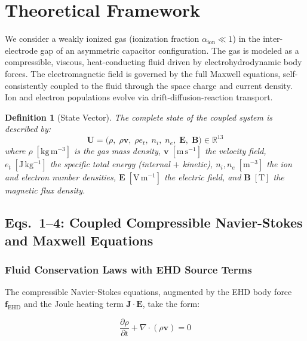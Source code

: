 \documentclass[12pt,twocolumn]{article}
\newtheorem{definition}{Definition}
\newcommand{\ee}{\mathbf{E}}
\newcommand{\bb}{\mathbf{B}}
\newcommand{\jj}{\mathbf{J}}
\newcommand{\vv}{\mathbf{v}}
\newcommand{\ff}{\mathbf{f}}
\newcommand{\uu}{\mathbf{U}}
\begin{document}
\section{Theoretical Framework}
\label{sec:theory}

We consider a weakly ionized gas (ionization fraction
$\alpha_{\mathrm{ion}} \ll 1$) in the inter-electrode gap of an
asymmetric capacitor configuration. The gas is modeled as a
compressible, viscous, heat-conducting fluid driven by
electrohydrodynamic body forces. The electromagnetic field is
governed by the full Maxwell equations, self-consistently coupled to
the fluid through the space charge and current density. Ion and
electron populations evolve via drift-diffusion-reaction transport.

\begin{definition}[State Vector]
\label{def:state}
The complete state of the coupled system is described by:
\begin{equation*}
  \uu = \bigl(\rho,\; \rho\vv,\; \rho e_t,\;
    n_i,\; n_e,\; \ee,\; \bb\bigr)
  \in \mathbb{R}^{13}
\end{equation*}
where $\rho\;[\mathrm{kg\,m^{-3}}]$ is the gas mass density,
$\vv\;[\mathrm{m\,s^{-1}}]$ the velocity field,
$e_t\;[\mathrm{J\,kg^{-1}}]$ the specific total energy
(internal $+$ kinetic),
$n_i, n_e\;[\mathrm{m^{-3}}]$ the ion and electron number densities,
$\ee\;[\mathrm{V\,m^{-1}}]$ the electric field, and
$\bb\;[\mathrm{T}]$ the magnetic flux density.
\end{definition}

\subsection{Eqs.~1--4: Coupled Compressible Navier-Stokes and
  Maxwell Equations}
\label{sec:theory:NS_Maxwell}

\subsubsection{Fluid Conservation Laws with EHD Source Terms}

The compressible Navier-Stokes equations, augmented by the EHD body
force $\ff_{\mathrm{EHD}}$ and the Joule heating term $\jj \cdot \ee$,
take the form:

\begin{equation}
\boxed{
  \frac{\partial \rho}{\partial t}
  + \nabla \cdot (\rho \vv) = 0
}
\tag{1}
\label{eq:NS1}
\end{equation}
\end{document}
